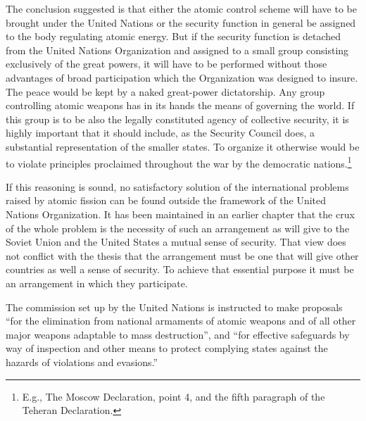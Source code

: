 The conclusion suggested is that either the atomic control scheme will have to be brought under the United Nations or the security function in general be assigned to the body regulating atomic energy. But if the security function is detached from the United Nations Organization and assigned to a small group consisting exclusively of the great powers, it will have to be performed without those advantages of broad participation which the Organization was designed to insure. The peace would be kept by a naked great-power dictatorship. Any group controlling atomic weapons has in its hands the means of governing the world. If this group is to be also the legally constituted agency of collective security, it is highly important that it should include, as the Security Council does, a substantial representation of the smaller states. To organize it otherwise would be to violate principles proclaimed throughout the war by the democratic nations.\footnote{E.g., The Moscow Declaration, point 4, and the fifth paragraph of the Teheran Declaration.}

If this reasoning is sound, no satisfactory solution of the international problems raised by atomic fission can be found outside the framework of the United Nations Organization. It has been maintained in an earlier chapter that the crux of the whole problem is the necessity of such an arrangement as will give to the Soviet Union and the United States a mutual sense of security. That view does not conflict with the thesis that the arrangement must be one that will give other countries as well a sense of security. To achieve that essential purpose it must be an arrangement in which they participate.

The commission set up by the United Nations is instructed to make proposals ``for the elimination from national armaments of atomic weapons and of all other major weapons adaptable to mass destruction'', and ``for effective safeguards by way of inspection and other means to protect complying states against the hazards of violations and evasions.''

